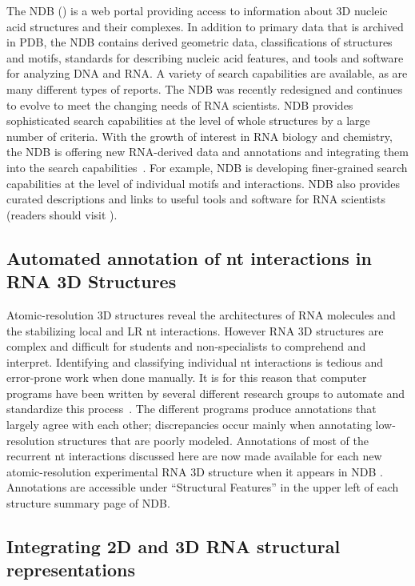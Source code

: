 The NDB () is a web portal providing access to
information about 3D nucleic acid structures and their complexes. In addition to
primary data that is archived in PDB, the NDB contains derived geometric data,
classifications of structures and motifs, standards for describing nucleic acid
features, and tools and software for analyzing DNA and RNA\@. A variety of
search capabilities are available, as are many different types of reports. The
NDB was recently redesigned and continues to evolve to meet the changing needs
of RNA scientists. NDB provides sophisticated search capabilities at the level
of whole structures by a large number of criteria. With the growth of interest
in RNA biology and chemistry, the NDB is offering new RNA-derived data and
annotations and integrating them into the search
capabilities~\cite{CoimbatoreNarayanan2014}. For example, NDB is developing
finer-grained search capabilities at the level of individual motifs and
interactions. NDB also provides curated descriptions and links to useful tools
and software for RNA scientists (readers should visit
).

\subsection{Automated annotation of nt interactions in RNA 3D Structures}

Atomic-resolution 3D structures reveal the architectures of RNA molecules and
the stabilizing local and LR nt interactions. However RNA 3D structures are
complex and difficult for students and non-specialists to comprehend and
interpret. Identifying and classifying individual nt interactions is tedious and
error-prone work when done manually. It is for this reason that computer
programs have been written by several different research groups to automate and
standardize this process~\cite{Petrov2011a, Sarver2008a, Yang2003a,
Gendron2001b, Parisien2008a}. The different programs produce annotations that
largely agree with each other; discrepancies occur mainly when annotating
low-resolution structures that are poorly modeled. Annotations of most of the
recurrent nt interactions discussed here are now made available for each new
atomic-resolution experimental RNA 3D structure when it appears in NDB
\cite{Petrov2013}. Annotations are accessible under ``Structural Features'' in
the upper left of each structure summary page of NDB\@. 

\subsection{Integrating 2D and 3D RNA structural representations}

